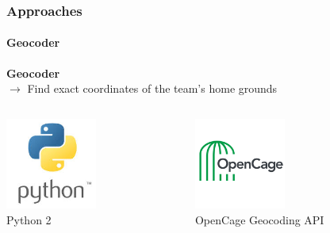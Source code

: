 \documentclass{beamer}
\begin{document}
	 \begin{frame}
    \frametitle{Approaches}
		\framesubtitle{Geocoder}
		\textbf{Geocoder} \\
		$\rightarrow$ Find exact coordinates of the team's home grounds
    \begin{columns}[T] %
     \begin{column}[T]{5cm} %
			\begin{center}
     \includegraphics[height=3cm]{python.jpg}\\
			Python 2
			\end{center}
     \end{column}
     \begin{column}[T]{5cm} %
		\begin{center}
		 \includegraphics[height=3cm]{opencage.png} \\
			OpenCage Geocoding API
			\end{center}
     \end{column}
     \end{columns}
  \end{frame}
	
\end{document}
